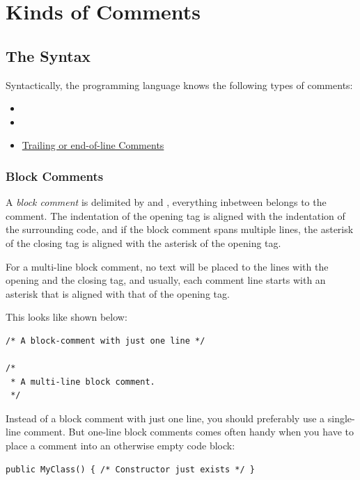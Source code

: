\chapter{Kinds of Comments}


\section{The Syntax}
Syntactically, the \Java programming language knows the following types of comments:
\begin{itemize}[nosep]
	\item{}
	\item{}
	\item{\hyperref[sec:TrailingComments]{Trailing or end-of-line Comments}}
\end{itemize}


\subsection{Block Comments}\label{sec:BlockComments}
A \textit{block comment} is delimited by \bdq{\lstinline|/*|} and \bdq{\lstinline|*/|}, everything inbetween belongs to the comment. The indentation of the opening tag is aligned with the indentation of the surrounding code, and if the block comment spans multiple lines, the asterisk of the closing tag is aligned with the asterisk of the opening tag.

For a multi-line block comment, no text will be placed to the lines with the opening and the closing tag, and usually, each comment line starts with an asterisk that is aligned with that of the opening tag.

This looks like shown below:
\begin{lstlisting}
/* A block-comment with just one line */

/*
 * A multi-line block comment.
 */
\end{lstlisting}

Instead of a block comment with just one line, you should preferably use a single-line comment. But one-line block comments comes often handy when you have to place a comment into an otherwise empty code block:
\begin{lstlisting}
public MyClass() { /* Constructor just exists */ }
\end{lstlisting}

